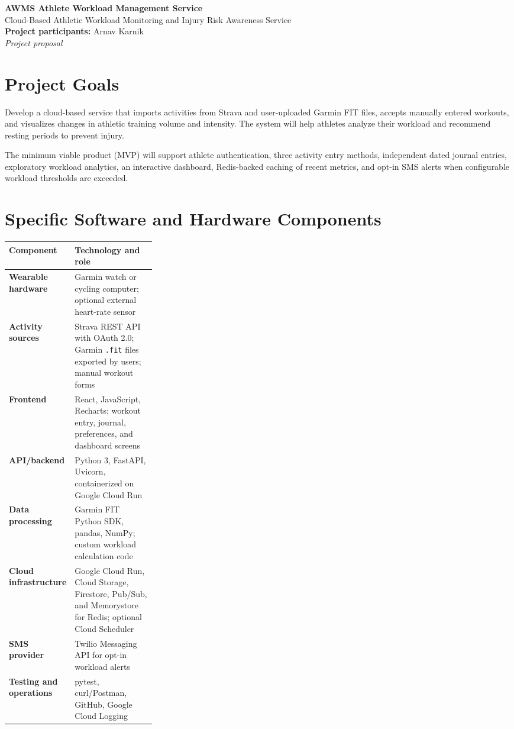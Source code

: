 \documentclass[11pt,letterpaper]{article}
\begin{document}
\begin{center}
{\LARGE\bfseries\color{navy} AWMS Athlete Workload Management Service}\\[4pt]
{\large Cloud-Based Athletic Workload Monitoring and Injury Risk Awareness Service}\\[8pt]
\textbf{Project participants:} Arnav Karnik\\
\textit{Project proposal}
\end{center}

\section{Project Goals}
Develop a cloud-based service that imports activities from Strava and user-uploaded Garmin FIT files, accepts manually entered workouts, and visualizes changes in athletic training volume and intensity. The system will help athletes analyze their workload and recommend resting periods to prevent injury. 

The minimum viable product (MVP) will support athlete authentication, three activity entry methods, independent dated journal entries, exploratory workload analytics, an interactive dashboard, Redis-backed caching of recent metrics, and opt-in SMS alerts when configurable workload thresholds are exceeded.

\section{Specific Software and Hardware Components}
\renewcommand{\arraystretch}{1.18}
\begin{tabularx}{\linewidth}{@{}>{\bfseries}p{0.29\linewidth}X@{}}
\toprule
Component & Technology and role\\ \midrule
Wearable hardware & Garmin watch or cycling computer; optional external heart-rate sensor\\
Activity sources & Strava REST API with OAuth 2.0; Garmin \texttt{.fit} files exported by users; manual workout forms\\
Frontend & React, JavaScript, Recharts; workout entry, journal, preferences, and dashboard screens\\
API/backend & Python 3, FastAPI, Uvicorn, containerized on Google Cloud Run\\
Data processing & Garmin FIT Python SDK, pandas, NumPy; custom workload calculation code\\
Cloud infrastructure & Google Cloud Run, Cloud Storage, Firestore, Pub/Sub, and Memorystore for Redis; optional Cloud Scheduler\\
SMS provider & Twilio Messaging API for opt-in workload alerts\\
Testing and operations & pytest, curl/Postman, GitHub, Google Cloud Logging\\
\bottomrule
\end{tabularx}
\end{document}
